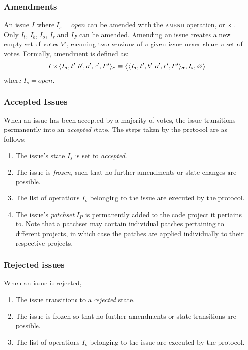 \subsubsection{Amendments}

An issue $I$ where $I_s = open$ can be amended with the \textsc{amend}
operation, or $\operatorname{\times}$. Only $I_t$, $I_b$, $I_o$, $I_r$ and $I_P$ can be
amended.  Amending an issue creates a new empty set of votes $V'$, ensuring two
versions of a given issue never share a set of votes. Formally, amendment is
defined as:
\begin{align*}
    I \operatorname{\times}{} \langle I_a, t', b', o', r', P' \rangle_{\sigma} \equiv
    \big<\langle I_a, t', b', o', r', P' \rangle_{\sigma}, I_s, \varnothing
    \big>
\end{align*}
where $I_s = open$.


\subsubsection{Accepted Issues} When an issue has been accepted by a majority
of votes, the issue transitions permanently into an \emph{accepted} state. The
steps taken by the protocol are as follows:

\begin{enumerate}
    \item The issue's state $I_s$ is set to \emph{accepted}.
    \item The issue is \emph{frozen}, such that no further amendments or state
        changes are possible.
    \item The list of operations $I_o$ belonging to the issue are executed by
        the protocol.
    \item The issue's \emph{patchset} $I_P$ is permanently added to the code
        project it pertains to. Note that a patchset may contain individual
        patches pertaining to different projects, in which case the patches are
        applied individually to their respective projects.
\end{enumerate}

\subsubsection{Rejected issues} When an issue is rejected,
\begin{enumerate}
    \item The issue transitions to a \emph{rejected} state.
    \item The issue is frozen so that no further amendments or state
        transitions are possible.
    \item The list of operations $I_o$ belonging to the issue are executed by
        the protocol.
\end{enumerate}

